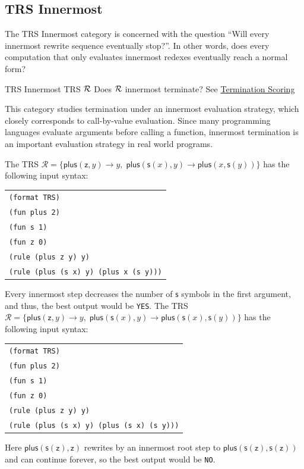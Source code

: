 \subsection{TRS Innermost}

The TRS Innermost category is concerned with the question 
``Will every innermost rewrite sequence eventually stop?''. 
In other words, does every computation that only evaluates innermost redexes eventually reach a normal form? 

\begin{formalproblem}
  {TRS Innermost}
  {TRS $\mathcal{R}$}
  {Does $\mathcal{R}$ innermost terminate?}
  {See \hyperref[scoring_termination]{Termination Scoring}}
\end{formalproblem}

\begin{motivation}
This category studies termination under an innermost evaluation strategy, 
which closely corresponds to call-by-value evaluation.
Since many programming languages evaluate arguments before calling a function, 
innermost termination is an important evaluation strategy in real world programs.
\end{motivation}

\begin{example}
The TRS $\mathcal{R} = \{\mathsf{plus}(\mathsf{z}, y) \to y,\; 
\mathsf{plus}(\mathsf{s}(x), y) \to \mathsf{plus}(x,\mathsf{s}(y))\}$ has the following input syntax:
\begin{center}
\begin{tabular}{l}
\texttt{(format TRS)} \\
\texttt{(fun plus 2)} \\
\texttt{(fun s 1)} \\
\texttt{(fun z 0)} \\
\texttt{(rule (plus z y) y)} \\
\texttt{(rule (plus (s x) y) (plus x (s y)))}
\end{tabular}
\end{center}
Every innermost step decreases the number of $\mathsf{s}$ symbols in the first argument, and thus, the best output would be \texttt{YES}.
The TRS $\mathcal{R} = \{\mathsf{plus}(\mathsf{z}, y) \to y,\; 
\mathsf{plus}(\mathsf{s}(x), y) \to \mathsf{plus}(\mathsf{s}(x),\mathsf{s}(y))\}$ has the following input syntax:
\begin{center}
\begin{tabular}{l}
\texttt{(format TRS)} \\
\texttt{(fun plus 2)} \\
\texttt{(fun s 1)} \\
\texttt{(fun z 0)} \\
\texttt{(rule (plus z y) y)} \\
\texttt{(rule (plus (s x) y) (plus (s x) (s y)))}
\end{tabular}
\end{center}
Here $\mathsf{plus}(\mathsf{s}(\mathsf{z}),\mathsf{z})$ rewrites by an innermost root step to 
$\mathsf{plus}(\mathsf{s}(\mathsf{z}),\mathsf{s}(\mathsf{z}))$ and can continue forever, so the best output would be \texttt{NO}.
\end{example}

